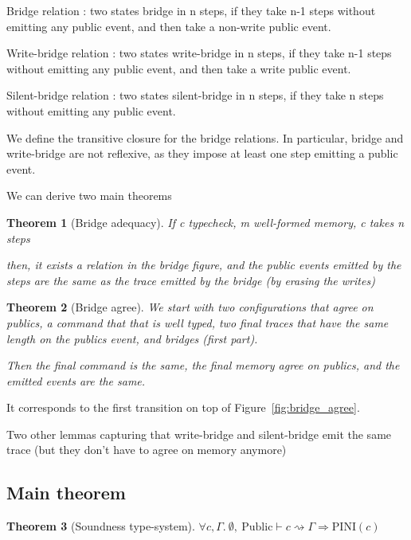 \documentclass[10pt]{article}
\newcommand{\ctx}{\Gamma}
\newcommand{\typing}[4]{ #1,~#2 \vdash #3 \rightsquigarrow #4}
\newcommand{\pini}[1]{\mathrm{PINI}(#1)}
\newtheorem{theorem}{Theorem}
\begin{document}
Bridge relation : two states bridge in n steps, if they take n-1 steps without emitting any public
event, and then take a non-write public event.

Write-bridge relation : two states write-bridge in n steps, if they take n-1 steps without emitting
any public event, and then take a write public event.

Silent-bridge relation : two states silent-bridge in n steps, if they take n steps without emitting
any public event.

We define the transitive closure for the bridge relations. In particular, bridge and write-bridge
are not reflexive, as they impose at least one step emitting a public event.




We can derive two main theorems
\begin{theorem}[Bridge adequacy]
  If c typecheck,
  m well-formed memory,
  c takes n steps

  then, it exists a relation in the bridge figure, and the public events
  emitted by the steps are the same as the trace emitted by the bridge (by erasing the writes)

\end{theorem}



\begin{theorem}[Bridge agree]
  We start with two configurations that agree on publics, a command that that is well typed, two
  final traces that have the same length on the publics event, and bridges (first part).

  Then the final command is the same, the final memory agree on publics, and the emitted events are
  the same.
\end{theorem}

It corresponds to the first transition on top of Figure~\ref{fig:bridge_agree}.

Two other lemmas capturing that write-bridge and silent-bridge emit the same trace (but they don't
have to agree on memory anymore)



\subsection{Main theorem}%
\label{subsec:main_theorem}

\begin{theorem}[Soundness type-system]
  \( \forall c, \ctx.\
  \typing{\emptyset}{\mathrm{Public}}{c}{\ctx}
  \Rightarrow \pini{c}
  \)
\end{theorem}
\end{document}
